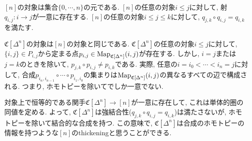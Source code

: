 \documentclass[uplatex, a4paper, 14Q, dvipdfmx]{jsreport}
\begin{document}

\begin{remark} \label{rem.1.1.5.2}
  $[n]$の対象は集合$\{0,\cdots,n\}$の元である. 
  $[n]$の任意の対象$i \leq j$に対して, 射$q_{i,j} : i \to j$が一意に存在する.
  $[n]$の任意の対象$i \leq j \leq k$に対して, $q_{j,k} \circ q_{i,j} = q_{i,k}$を満たす.  

  $\mathfrak{C}[\Delta^n]$の対象は$[n]$の対象と同じである.
  $\mathfrak{C}[\Delta^n]$の任意の対象$i \leq j$に対して, $\{i,j\} \in P_{i,j}$から定まる点$p_{i,j} \in \mathrm{Map}_{\mathfrak{C}[\Delta^n]}(i,j)$が存在する. 
  しかし, $i=j$または$j=k$のときを除いて, $p_{j,k} \circ p_{i,j} \neq p_{i,k}$である. 
  実際, 任意の$i=i_0< \cdots < i_n=j$に対して, 合成$p_{i_n,i_{n-1}} \circ \cdots \circ p_{i_1,i_0}$の集まりは$\mathrm{Map}_{\mathfrak{C}[\Delta^n]}(i,j)$の異なるすべての辺で構成される. 
  つまり, ホモトピーを除いてでしか一意でない. 

  対象上で恒等的である関手$\mathfrak{C}[\Delta^n] \to [n]$が一意に存在して, これは単体的圏の同値を定める. 
  よって, $\mathfrak{C}[\Delta^n]$は強結合性($q_{j,k} \circ q_{i,j} = q_{i,k}$)は満たさないが, ホモトピーを除いて結合的な合成を持つ. 
  この意味で, $\mathfrak{C}[\Delta^n]$は合成のホモトピーの情報を持つような$[n]$のthickeningと思うことができる. 
\end{remark}
\end{document}
